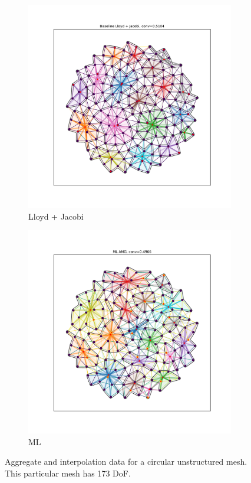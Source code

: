 \documentclass{article}
\begin{document}
\begin{figure}[h]
\begin{subfigure}[t]{0.32\textwidth}
    \includegraphics[width=\textwidth, trim=80 70 70 50, clip]{grid_circle_lloyd.pdf}
    \caption{Lloyd + Jacobi}
  \end{subfigure}
  \begin{subfigure}[t]{0.32\textwidth}
    \centering
    \includegraphics[width=\textwidth, trim=80 70 70 50, clip]{grid_circle_ml.pdf}
    \caption{ML}
  \end{subfigure}
  \caption{Aggregate and interpolation data for a circular unstructured mesh.  This particular mesh has 173 DoF.}
  \label{fig:gridcircle}
\end{figure}
\end{document}

